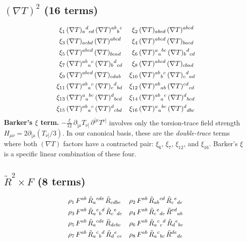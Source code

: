 \documentclass[12pt,a4paper]{article}
\newcommand{\Rt}{\tilde{R}}         %
\newcommand{\del}{\nabla}            %
\newcommand{\pd}{\partial}           %
\begin{document}
\subsection{$(\del T)^2$ (16 terms)}
\begin{align}
  \xi_1&\, (\del T)_{a}{}^{d}{}_{cd}\, (\del T)^{ab}{}_{b}{}^{c}  &
  \xi_2&\, (\del T)_{abcd}\, (\del T)^{abcd}  \notag\\
  \xi_3&\, (\del T)_{acbd}\, (\del T)^{abcd}  &
  \xi_4&\, (\del T)^{abcd}\, (\del T)_{bacd}  \notag\\
  \xi_5&\, (\del T)^{abcd}\, (\del T)_{bcad}  &
  \xi_6&\, (\del T)^{a}{}_{a}{}^{bc}\, (\del T)_{b}{}^{d}{}_{cd}  \notag\\
  \xi_7&\, (\del T)^{ab}{}_{a}{}^{c}\, (\del T)_{b}{}^{d}{}_{cd}  &
  \xi_8&\, (\del T)^{abcd}\, (\del T)_{cbad}  \notag\\
  \xi_9&\, (\del T)^{abcd}\, (\del T)_{cdab}  &
  \xi_{10}&\, (\del T)^{ab}{}_{b}{}^{c}\, (\del T)_{c}{}^{d}{}_{ad}  \notag\\
  \xi_{11}&\, (\del T)^{ab}{}_{a}{}^{c}\, (\del T)_{c}{}^{d}{}_{bd}  &
  \xi_{12}&\, (\del T)^{ab}{}_{ab}\, (\del T)^{cd}{}_{cd}  \notag\\
  \xi_{13}&\, (\del T)^{a}{}_{a}{}^{bc}\, (\del T)^{d}{}_{bcd}  &
  \xi_{14}&\, (\del T)^{ab}{}_{a}{}^{c}\, (\del T)^{d}{}_{bcd}  \notag\\
  \xi_{15}&\, (\del T)^{ab}{}_{a}{}^{c}\, (\del T)^{d}{}_{cbd}  &
  \xi_{16}&\, (\del T)^{a}{}_{a}{}^{bc}\, (\del T)^{d}{}_{dbc}
  \label{eq:dt_dt_explicit}
\end{align}
\noindent\textbf{Barker's $\xi$ term.}
$-\frac{\xi}{12}\, \pd_{[\mu} T_{\nu]}\, \pd^{[\mu} T^{\nu]}$
involves only the torsion-trace field strength
$H_{\mu\nu} = 2\pd_{[\mu}(T_{\nu]}/3)$.
In our canonical basis, these are the \emph{double-trace} terms
where both $(\del T)$ factors have a contracted pair:
$\xi_6$, $\xi_7$, $\xi_{12}$, and $\xi_{16}$.
Barker's $\xi$ is a specific linear combination of these four.

\subsection{$\Rt^2 \times F$ (8 terms)}
\begin{align}
  \rho_1&\, F^{ab}\, \Rt_{a}{}^{cde}\, \Rt_{cdbe}  &
  \rho_2&\, F^{ab}\, \Rt_{ab}{}^{cd}\, \Rt_{c}{}^{e}{}_{de}  \notag\\
  \rho_3&\, F^{ab}\, \Rt_{a}{}^{c}{}_{b}{}^{d}\, \Rt_{c}{}^{e}{}_{de}  &
  \rho_4&\, F^{ab}\, \Rt_{c}{}^{e}{}_{de}\, \Rt^{cd}{}_{ab}  \notag\\
  \rho_5&\, F^{ab}\, \Rt_{a}{}^{cde}\, \Rt_{debc}  &
  \rho_6&\, F^{ab}\, \Rt_{a}{}^{c}{}_{c}{}^{d}\, \Rt_{d}{}^{e}{}_{be}  \notag\\
  \rho_7&\, F^{ab}\, \Rt_{a}{}^{c}{}_{b}{}^{d}\, \Rt_{d}{}^{e}{}_{ce}  &
  \rho_8&\, F^{ab}\, \Rt_{a}{}^{c}{}_{bc}\, \Rt^{de}{}_{de}
  \label{eq:rrf_explicit}
\end{align}
\end{document}
